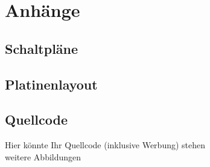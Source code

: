 \documentclass [11pt,a4paper,bibliography=totoc]{scrreprt}%
\begin{document}
\chapter{Anhänge}
\section{Schaltpläne}

\section{Platinenlayout}

\section{Quellcode}
Hier könnte Ihr Quellcode (inklusive Werbung) stehen\\
%


weitere Abbildungen
\listoffigures
\listoftables
\end{document}
